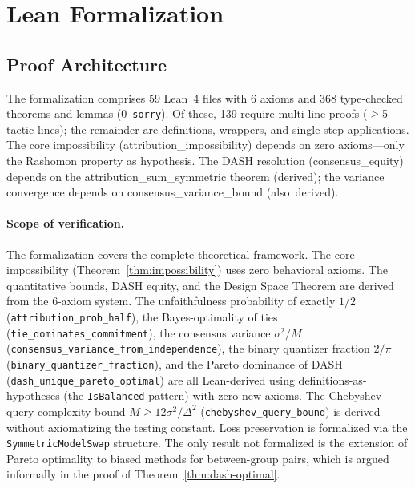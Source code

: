 \documentclass{jmlr}
\begin{document}

\section{Lean Formalization}
\label{sec:lean}

\subsection{Proof Architecture}

The formalization comprises 59 Lean~4 files with 6 axioms and 368 type-checked theorems and lemmas (0~\texttt{sorry}). Of these, 139 require multi-line proofs ($\geq$5 tactic lines); the remainder are definitions, wrappers, and single-step applications.
The core impossibility (\textsf{attribution\_impossibility}) depends on zero axioms---only the Rashomon property as hypothesis.
The DASH resolution (\textsf{consensus\_equity}) depends on the \textsf{attribution\_sum\_symmetric} theorem (derived); the variance convergence depends on \textsf{consensus\_variance\_bound} (also~derived).

\paragraph{Scope of verification.}
\begin{sloppypar}
The formalization covers the complete theoretical framework. The core impossibility (Theorem~\ref{thm:impossibility}) uses zero behavioral axioms. The quantitative bounds, DASH equity, and the Design Space Theorem are derived from the 6-axiom system. The unfaithfulness probability of exactly $1/2$ (\texttt{attribution\_prob\_half}), the Bayes-optimality of ties (\texttt{tie\_dominates\_commitment}), the consensus variance $\sigma^2/M$ (\texttt{consensus\_variance\_from\_independence}), the binary quantizer fraction $2/\pi$ (\texttt{binary\_quantizer\_fraction}), and the Pareto dominance of DASH (\texttt{dash\_unique\_pareto\_optimal}) are all Lean-derived using definitions-as-hypotheses (the \texttt{IsBalanced} pattern) with zero new axioms. The Chebyshev query complexity bound $M \geq 12\sigma^2/\Delta^2$ (\texttt{chebyshev\_query\_bound}) is derived without axiomatizing the testing constant. Loss preservation is formalized via the \texttt{SymmetricModelSwap} structure. The only result not formalized is the extension of Pareto optimality to biased methods for between-group pairs, which is argued informally in the proof of Theorem~\ref{thm:dash-optimal}.
\end{sloppypar}
\end{document}
